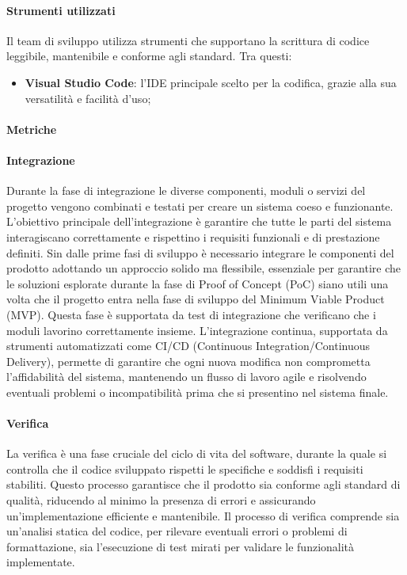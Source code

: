     \paragraph{Strumenti utilizzati}
    Il team di sviluppo utilizza strumenti che supportano la scrittura di codice leggibile, mantenibile e conforme agli standard. Tra questi:
    \begin{itemize}
        \item \textbf{Visual Studio Code}: l'IDE principale scelto per la codifica, grazie alla sua versatilità e facilità d'uso;
    \end{itemize}
    
    \paragraph{Metriche}
    
    \paragraph{Integrazione}
    Durante la fase di integrazione le diverse componenti, moduli o servizi del progetto vengono combinati e testati per creare un sistema coeso e funzionante. 
    L'obiettivo principale dell'integrazione è garantire che tutte le parti del sistema interagiscano correttamente e rispettino i requisiti funzionali e di prestazione definiti. 
    Sin dalle prime fasi di sviluppo è necessario integrare le componenti del prodotto adottando un approccio solido ma flessibile, essenziale per garantire che le soluzioni esplorate durante la fase di Proof of Concept (PoC) siano utili una volta che il progetto entra nella fase di sviluppo del Minimum Viable Product (MVP). 
    Questa fase è supportata da test di integrazione che verificano che i moduli lavorino correttamente insieme. L'integrazione continua, supportata da strumenti automatizzati come CI/CD (Continuous Integration/Continuous Delivery), permette di garantire che ogni nuova modifica non comprometta l'affidabilità del sistema, mantenendo un flusso di lavoro agile e risolvendo eventuali problemi o incompatibilità prima che si presentino nel sistema finale.
    
    \paragraph{Verifica}
    La verifica è una fase cruciale del ciclo di vita del software, durante la quale si controlla che il codice sviluppato rispetti le specifiche e soddisfi i requisiti stabiliti. Questo processo garantisce che il prodotto sia conforme agli standard di qualità, riducendo al minimo la presenza di errori e assicurando un’implementazione efficiente e mantenibile. 
    Il processo di verifica comprende sia un’analisi statica del codice, per rilevare eventuali errori o problemi di formattazione, sia l’esecuzione di test mirati per validare le funzionalità implementate.



